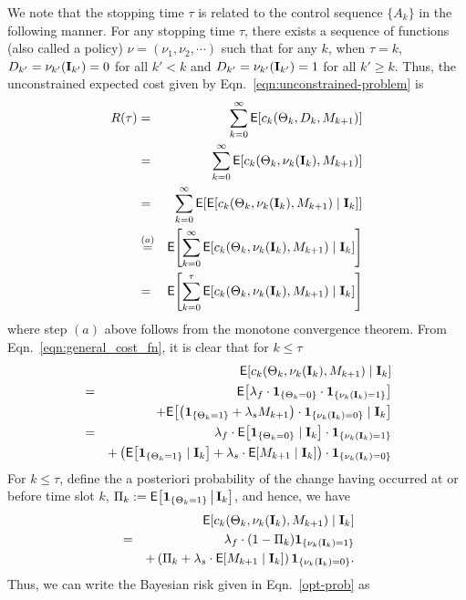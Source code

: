 \documentclass[journal]{IEEEtran}
\newcommand{\EXP}[1]{\mathsf{E}\!\left[#1\right]}
\newcommand{\nn}{\nonumber \\}
\begin{document}
We note that the stopping
time $\tau$ is related to the control sequence $\{A_k\}$ in the
following manner. For any stopping time $\tau$, there exists a sequence
of functions (also called a policy) $\nu=(\nu_1,\nu_2,\cdots)$ such that
for any $k$, when $\tau=k$, $D_{k'} = \nu_{k'}({\bf I}_{k'}) = 0$ for 
all $k' < k$ and $D_{k'} = \nu_{k'}({\bf I}_{k'}) = 1$ for all $k' 
\geqslant k$. Thus, the unconstrained expected cost given by Eqn.~\ref{eqn:unconstrained-problem}  
is 
\begin{eqnarray}
 R(\tau)
& = & \sum_{k=0}^{\infty} \EXP{c_k(\Theta_k,D_k,M_{k+1}) } \nn
& = & \sum_{k=0}^{\infty} \EXP{c_k(\Theta_k,\nu_k({\bf I}_k),M_{k+1}) } \nn
& = & \sum_{k=0}^{\infty} \EXP{\EXP{c_k(\Theta_k,\nu_k({\bf I}_k),M_{k+1})\mid {\bf
I}_k }}\nn
 \label{opt-prob}
& \stackrel{(a)}{=} & \EXP{\sum_{k=0}^{\infty} \EXP{c_k(\Theta_k,\nu_k({\bf I}_k),M_{k+1})\mid {\bf
I}_k }}  \\
& = & \EXP{\sum_{k=0}^{\tau} \EXP{c_k(\Theta_k,\nu_k({\bf I}_k),M_{k+1})\mid {\bf I}_k
}}\nonumber
\end{eqnarray}
where step $(a)$ above follows from the monotone convergence theorem. 
From Eqn.~\ref{eqn:general_cost_fn}, it is clear that for $k \leqslant \tau$
\begin{eqnarray*}
& & \EXP{c_k(\Theta_k,\nu_k({\bf I}_k),M_{k+1})\mid {\bf I}_k } \nn
& = & \EXP{\lambda_f \cdot {\bf 1}_{\{\Theta_k = 0\}}
\cdot {\bf 1}_{\{\nu_k({\bf I}_k) = 1\}}} \nn
& & + \EXP{\left( {\bf 1}_{\{\Theta_k = 1\}} + \lambda_s M_{k+1} \right) \cdot
{\bf 1}_{\{\nu_k({\bf I}_k) = 0\}}
\mid {\bf I}_k }\nn
& = & \lambda_f \cdot \EXP{{\bf 1}_{\{\Theta_k = 0\}} \mid {\bf I}_k } 
\cdot {\bf 1}_{\{\nu_k({\bf I}_k) = 1\}} \nn
& & + 
\left(
\EXP{ {\bf 1}_{\{\Theta_k = 1\}} \mid {\bf I}_k } + 
\lambda_s \cdot \EXP{ M_{k+1}  \mid {\bf I}_k } \right) \cdot {\bf
1}_{\{\nu_k({\bf I}_k) = 0\}}
\end{eqnarray*}
For $k \leqslant \tau$, define the a posteriori probability of the change having occurred 
at or before time slot $k$, 
$\Pi_k := \EXP{{\bf 1}_{\{\Theta_k = 1\}} \big\arrowvert {\bf I}_k}$, and hence, we
have 
\begin{eqnarray}
\label{eqn:ctilde-cost-fn}
&  & \EXP{c_k(\Theta_k,\nu_k({\bf I}_k),M_{k+1})\mid {\bf I}_k } \nn
& = & \lambda_f \cdot (1-\Pi_k)  {\bf 1}_{\{\nu_k({\bf I}_k) = 1\}}\nn
& & + 
\left( \Pi_k + \lambda_s \cdot \EXP{ M_{k+1}  \mid {\bf I}_k } \right)
 {\bf 1}_{\{\nu_k({\bf I}_k) = 0\}}.
\end{eqnarray}
Thus, we can write the Bayesian risk given in
Eqn.~\ref{opt-prob} as 
\end{document}
